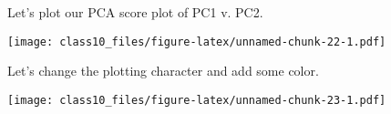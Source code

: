 \documentclass[
]{article}
\newenvironment{Shaded}{\begin{snugshade}}{\end{snugshade}}
\newcommand{\AttributeTok}[1]{\textcolor[rgb]{0.77,0.63,0.00}{#1}}
\newcommand{\DecValTok}[1]{\textcolor[rgb]{0.00,0.00,0.81}{#1}}
\newcommand{\FunctionTok}[1]{\textcolor[rgb]{0.00,0.00,0.00}{#1}}
\newcommand{\NormalTok}[1]{#1}
\newcommand{\SpecialCharTok}[1]{\textcolor[rgb]{0.00,0.00,0.00}{#1}}
\begin{document}
Let's plot our PCA score plot of PC1 v. PC2.

\begin{Shaded}
\end{Shaded}

\texttt{[image: class10\_files/figure-latex/unnamed-chunk-22-1.pdf]}

Let's change the plotting character and add some color.

\begin{Shaded}
\end{Shaded}

\texttt{[image: class10\_files/figure-latex/unnamed-chunk-23-1.pdf]}
\end{document}
